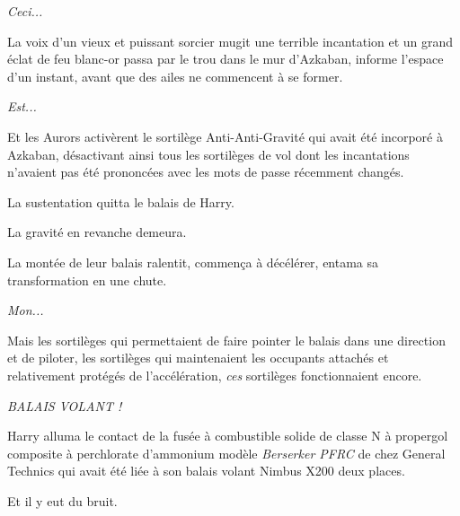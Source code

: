\emph{Ceci...} 

La voix d'un vieux et puissant sorcier mugit une terrible incantation et un grand éclat de feu blanc-or passa par le trou dans le mur d'Azkaban, informe l'espace d'un instant, avant que des ailes ne commencent à se former.

\emph{Est...} 

Et les Aurors activèrent le sortilège Anti-Anti-Gravité qui avait été incorporé à Azkaban, désactivant ainsi tous les sortilèges de vol dont les incantations n'avaient pas été prononcées avec les mots de passe récemment changés.

La sustentation quitta le balais de Harry.

La gravité en revanche demeura.

La montée de leur balais ralentit, commença à décélérer, entama sa transformation en une chute.

\emph{Mon...} 

Mais les sortilèges qui permettaient de faire pointer le balais dans une direction et de piloter, les sortilèges qui maintenaient les occupants attachés et relativement protégés de l'accélération, \emph{ces}  sortilèges fonctionnaient encore.

\emph{BALAIS VOLANT !} 

Harry alluma le contact de la fusée à combustible solide de classe N à propergol composite à perchlorate d'ammonium modèle \emph{Berserker PFRC}  de chez General Technics qui avait été liée à son balais volant Nimbus X200 deux places.

Et il y eut du bruit.

